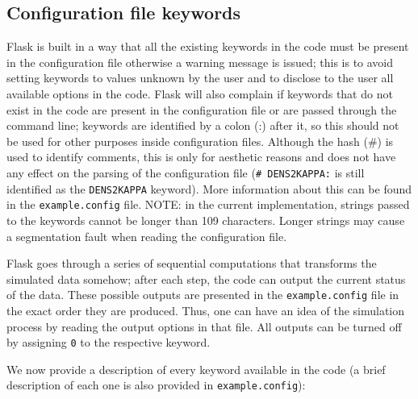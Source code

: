 \documentclass[12pt]{book} %
\begin{document}
  
\subsection{Configuration file keywords}
\label{sec:keywords}

{\sc Flask} is built in a way that all the existing keywords in the code must be present in the 
configuration file otherwise a warning message is issued; this is to avoid setting keywords to 
values unknown by the user and to disclose to the user all available options in the code. 
{\sc Flask} will also complain if keywords that do not exist in the code are present in the 
configuration file or are passed through the command line; keywords are identified by a colon (:) 
after it, so this should not be used for other purposes inside configuration files. Although 
the hash (\#) is used to identify comments, this is only for aesthetic reasons and does not have 
any effect on the parsing of the configuration file ({\tt \# DENS2KAPPA:} is still identified as 
the {\tt DENS2KAPPA} keyword). More information about this can be found in the {\tt example.config} 
file. 
NOTE: in the current implementation, strings passed to the keywords cannot be longer than 109 
characters. Longer strings may cause a segmentation fault when reading the configuration file. 

{\sc Flask} goes through a series of sequential computations that transforms the simulated data somehow; 
after each step, the code can output the current status of the data. These possible outputs are 
presented in the {\tt example.config} file in the exact order they are produced. Thus, one can 
have an idea of the simulation process by reading the output options in that file. All outputs 
can be turned off by assigning {\tt 0} to the respective keyword.

We now provide a description of every keyword available in the code (a brief description of 
each one is also provided in {\tt example.config}):
\end{document}

